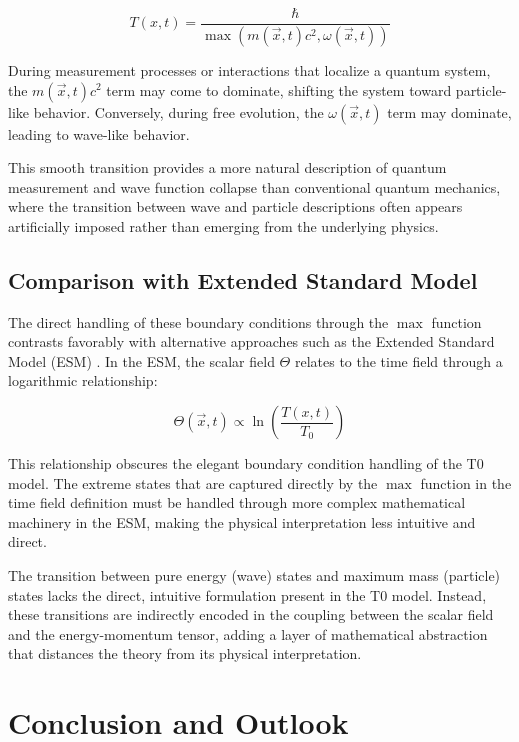 \documentclass[12pt,a4paper]{article}
\newcommand{\Tfieldt}{T(x,t)}
\newcommand{\Tzero}{T_0}
\newcommand{\vecx}{\vec{x}}
\begin{document}
	\begin{equation}
		\Tfieldt = \frac{\hbar}{\max(m(\vecx,t)c^2, \omega(\vecx,t))}
		\label{eq:boundary_transition}
	\end{equation}
	
	During measurement processes or interactions that localize a quantum system, the $m(\vecx,t)c^2$ term may come to dominate, shifting the system toward particle-like behavior. Conversely, during free evolution, the $\omega(\vecx,t)$ term may dominate, leading to wave-like behavior.
	
	This smooth transition provides a more natural description of quantum measurement and wave function collapse than conventional quantum mechanics, where the transition between wave and particle descriptions often appears artificially imposed rather than emerging from the underlying physics.
	
	\subsection{Comparison with Extended Standard Model}
	\label{subsec:comparison_esm}
	
	The direct handling of these boundary conditions through the $\max$ function contrasts favorably with alternative approaches such as the Extended Standard Model (ESM) \cite{pascher_standardmod_2025}. In the ESM, the scalar field $\Theta$ relates to the time field through a logarithmic relationship:
	
	\begin{equation}
		\Theta(\vecx,t) \propto \ln\left(\frac{\Tfieldt}{\Tzero}\right)
		\label{eq:theta_relation}
	\end{equation}
	
	This relationship obscures the elegant boundary condition handling of the T0 model. The extreme states that are captured directly by the $\max$ function in the time field definition must be handled through more complex mathematical machinery in the ESM, making the physical interpretation less intuitive and direct.
	
	The transition between pure energy (wave) states and maximum mass (particle) states lacks the direct, intuitive formulation present in the T0 model. Instead, these transitions are indirectly encoded in the coupling between the scalar field and the energy-momentum tensor, adding a layer of mathematical abstraction that distances the theory from its physical interpretation.
	
	\section{Conclusion and Outlook}
	\label{sec:conclusion}
	
\end{document}
